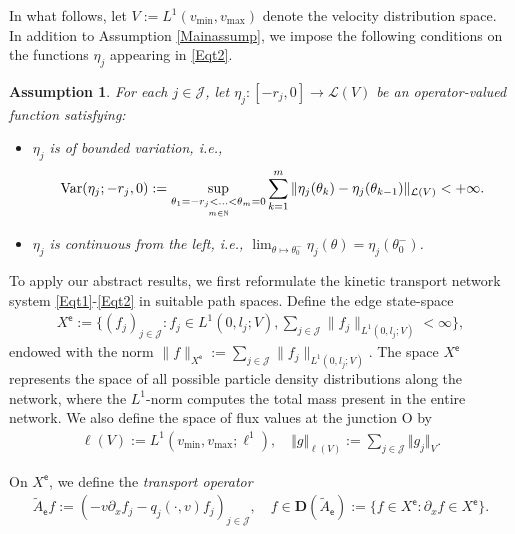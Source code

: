 \documentclass[onecolumn]{autart}
\def\calL{{\mathcal{L}}}
\def\N{\mathbb N}
\newtheorem{mainassumptions}{Assumption}[section]
\numberwithin{equation}{section}
\begin{document}
	In what follows, let $V := L^1(v_{\min}, v_{\max})$ denote the velocity distribution space. In addition to Assumption \ref{Mainassump}, we impose the following conditions on the functions $\eta_j$ appearing in \eqref{Eqt2}.
	
	\begin{mainassumptions}\label{Mainassump1}
		For each $j \in \mathcal{J}$, let $\eta_j: [-r_j, 0] \to \mathcal{L}{(V)}$ be an operator-valued function satisfying:
		\begin{itemize}
			\item[(i)]  $\eta_j$ is of bounded variation, i.e.,
			\begin{align*}
				{\rm Var}(\eta_j;-r_j,0) :=\sup_{\underset{m\in \N}{\theta_1=-r_j<\ldots<\theta_m=0}} \sum_{k=1}^{m}\Vert \eta_j(\theta_k)-\eta_j(\theta_{k-1})\Vert_{\calL(V)}<+\infty.
			\end{align*}
			\item[(ii)] $\eta_j$ is continuous from the left, i.e., $				\lim_{\theta \mapsto \theta_0^{-}}\eta_j(\theta)=\eta_j(\theta_0^{-})$.
			
		\end{itemize}
	\end{mainassumptions}
	
	To apply our abstract results, we first reformulate the kinetic transport network system \eqref{Eqt1}-\eqref{Eqt2} in suitable path spaces. Define the edge state-space
	\begin{align*}
		X^{\mathsf{e}}:=\big\{ (f_j)_{j\in \mathcal{J}} : f_j \in L^1(0,l_j;V),
		\sum_{j\in \mathcal{J}} \|f_j\|_{L^1(0,l_j;V)} < \infty \big\},
	\end{align*}
	endowed with the norm $\|f \|_{X^{\mathsf{e}}} :=\sum_{j\in \mathcal{J}} \|f_j\|_{L^1(0,l_j;V)}$. The space $X^{\mathsf{e}}$ represents the space of all possible particle density distributions along the network, where the $L^1$-norm computes the total mass present in the entire network. We also define the space of flux values at the junction O by
	\begin{align*}
		{\bm \ell}(V):=L^1(v_{\min},v_{\max};\ell^1),\quad \Vert g \Vert_{{\bm \ell}(V)} :=\sum_{j\in \mathcal{J}}\Vert g_j\Vert_{V}.
	\end{align*}
	
	On $X^{\mathsf{e}}$, we define the \emph{transport operator}
	\begin{align}\label{Trp-op}
		\tilde{A}_{\mathsf{e}}f:= \left(-v\partial_x f_j- q_j(\cdot,v)f_j\right)_{j\in \mathcal{J}},\quad f\in {\bm D}(\tilde{A}_{\mathsf{e}}):= \big\{ f \in X^{\mathsf{e}}: \partial_x f\in X^{\mathsf{e}}\big\}.
	\end{align}
	
\end{document}
